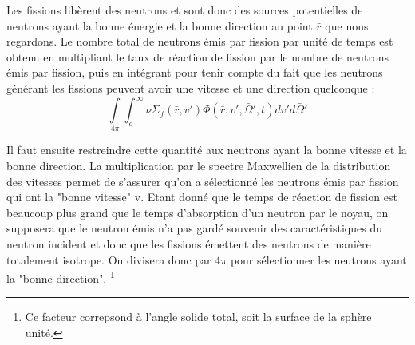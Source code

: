 Les fissions libèrent des neutrons et sont donc des sources potentielles de neutrons ayant 
la bonne énergie et la bonne direction au point $\bar r$ que nous regardons. Le nombre total de
neutrons émis par fission par unité de temps est obtenu en multipliant le taux de réaction
de fission par le nombre de neutrons émis par fission, puis en intégrant pour tenir
compte du fait que les neutrons générant les fissions peuvent avoir une vitesse
et une direction quelconque :
\begin{equation}
\int\limits_{4\pi }    \int_o^\infty     \nu {\Sigma _f}(\bar r,v')\varPhi (\bar r,v',\bar \Omega ',t)dv'd\bar \Omega '
\end{equation}

Il faut ensuite restreindre cette quantité aux neutrons ayant la bonne vitesse et la bonne direction.
La multiplication par le spectre Maxwellien de la distribution des vitesses permet de s'assurer
qu'on a sélectionné les neutrons émis par fission qui ont la "bonne vitesse" v.
Etant donné que le temps de réaction de fission est beaucoup plus grand que le temps d'absorption
d'un neutron par le noyau, on supposera que le neutron émis n'a pas gardé souvenir des caractéristiques
du neutron incident et donc que les fissions émettent des neutrons de manière totalement
isotrope. On divisera donc par $4\pi$ pour sélectionner les neutrons ayant la "bonne direction".
\footnote{Ce facteur correpsond à l'angle solide total, soit la surface de la sphère unité.}


